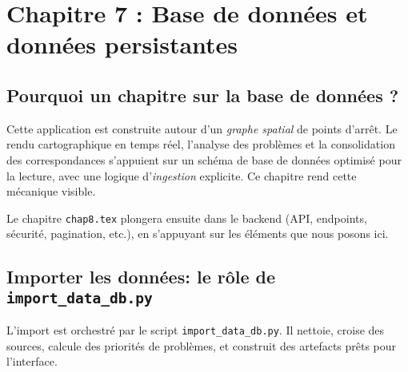 \chapter{Chapitre 7 : Base de données et données persistantes}

\section*{Pourquoi un chapitre sur la base de données ?}

Cette application est construite autour d'un \textit{graphe spatial} de points d'arrêt. Le rendu cartographique en temps réel, l'analyse des problèmes et la consolidation des correspondances s'appuient sur un schéma de base de données optimisé pour la lecture, avec une logique d'\textit{ingestion} explicite. Ce chapitre rend cette mécanique visible.

\vspace{0.5em}
Le chapitre \texttt{chap8.tex} plongera ensuite dans le backend (API, endpoints, sécurité, pagination, etc.), en s'appuyant sur les éléments que nous posons ici.


\section{Importer les données: le rôle de \texttt{import\_data\_db.py}}
L'import est orchestré par le script \texttt{import\_data\_db.py}. Il nettoie, croise des sources, calcule des priorités de problèmes, et construit des artefacts prêts pour l'interface.

